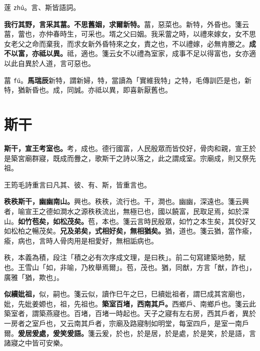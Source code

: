 \begin{quoting}蓫 \texttt{zhú}。言、斯皆語詞。\end{quoting}

\textbf{我行其野，言采其葍。不思舊姻，求爾新特。}{\footnotesize 葍，惡菜也。新特，外昏也。箋云葍，䔰也，亦仲春時生，可采也。壻之父曰姻。我采䔰之時，以禮來嫁女，女不思女老父之命而棄我，而求女新外昏特來之女，責之也，不以禮嫁，必無肯媵之。}\textbf{成不以富，亦祗以異。}{\footnotesize 祗，適也。箋云女不以禮為室家，成事不足以得富也，女亦適以此自異於人道，言可惡也。}

\begin{quoting}葍 \texttt{fú}。\textbf{馬瑞辰}新特，謂新婦，特，當讀為「實維我特」之特，毛傳訓匹是也，新特，猶新昏也。成，同誠。亦祗以異，即喜新厭舊也。\end{quoting}

\section{斯干}


\textbf{斯干，宣王考室也。}{\footnotesize 考，成也。德行國富，人民殷眾而皆佼好，骨肉和親，宣王於是築宮廟群寢，既成而釁之，歌斯干之詩以落之，此之謂成室。宗廟成，則又祭先祖。}

\begin{quoting}王筠毛詩重言曰凡其、彼、有、斯，皆重言也。\end{quoting}

\textbf{秩秩斯干，幽幽南山。}{\footnotesize 興也。秩秩，流行也。干，澗也。幽幽，深遠也。箋云興者，喻宣王之德如澗水之源秩秩流出，無極已也，國以饒富，民取足焉，如於深山。}\textbf{如竹苞矣，如松茂矣。}{\footnotesize 苞，本也。箋云言時民殷眾，如竹之本生矣，其佼好又如松柏之暢茂矣。}\textbf{兄及弟矣，式相好矣，無相猶矣。}{\footnotesize 猶，道也。箋云猶，當作瘉，瘉，病也，言時人骨肉用是相愛好，無相詬病也。}

\begin{quoting}秩，本義為積，段注「積之必有次序成文理，是曰秩」。前二句寫建築地勢，賦也。王雪山「如，非喻，乃枚舉焉爾」。苞，茂也。猶，同猷，方言「猷，詐也」，廣雅「猶，欺也」。\end{quoting}

\textbf{似續妣祖，}{\footnotesize 似，嗣也。箋云似，讀作巳午之巳，巳續妣祖者，謂巳成其宮廟也，妣，先妣姜嫄也，祖，先祖也。}\textbf{築室百堵，西南其戶。}{\footnotesize 西鄉戶、南鄉戶也。箋云此築室者，謂築燕寢也。百堵，百堵一時起也。天子之寢有左右房，西其戶者，異於一房者之室戶也，又云南其戶者，宗廟及路寢制如明堂，每室四戶，是室一南戶爾。}\textbf{爰居爰處，爰笑爰語。}{\footnotesize 箋云爰，於也，於是居，於是處，於是笑，於是語，言諸寢之中皆可安樂。}

